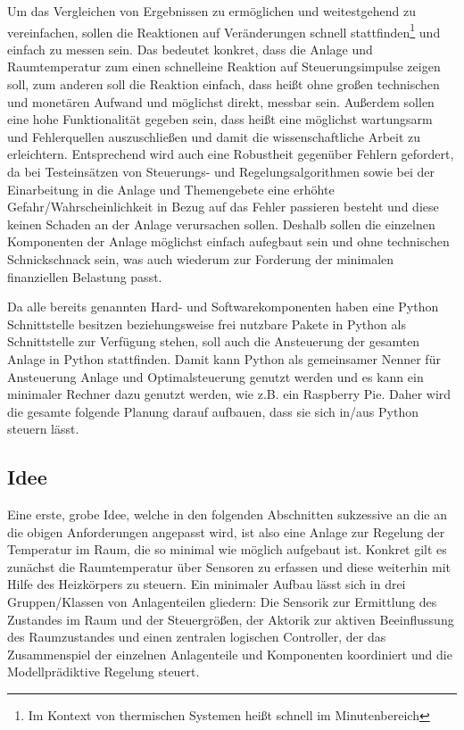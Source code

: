 Um das Vergleichen von Ergebnissen zu ermöglichen und weitestgehend zu vereinfachen, sollen die Reaktionen auf Veränderungen schnell stattfinden\footnote{Im Kontext von thermischen Systemen heißt schnell im Minutenbereich} und einfach zu messen sein. Das bedeutet konkret, dass die Anlage und Raumtemperatur zum einen \Gun schnell\Gob eine Reaktion auf Steuerungsimpulse zeigen soll, zum anderen soll die Reaktion einfach, dass heißt ohne großen technischen und monetären Aufwand und möglichst direkt, messbar sein. 
Außerdem sollen eine hohe Funktionalität gegeben sein, dass heißt eine möglichst wartungsarm und Fehlerquellen auszuschließen und damit die wissenschaftliche Arbeit zu erleichtern. Entsprechend wird auch eine Robustheit gegenüber Fehlern gefordert, da bei Testeinsätzen von Steuerungs- und Regelungsalgorithmen sowie bei der Einarbeitung in die Anlage und Themengebete eine erhöhte Gefahr/Wahrscheinlichkeit in Bezug auf das Fehler passieren besteht und diese keinen Schaden an der Anlage verursachen sollen. Deshalb sollen die einzelnen Komponenten der Anlage möglichst einfach aufegbaut sein und ohne technischen Schnickschnack sein, was auch wiederum zur Forderung der minimalen finanziellen Belastung passt.

Da alle bereits genannten Hard- und Softwarekomponenten haben eine Python Schnittstelle besitzen beziehungsweise frei nutzbare Pakete in Python als Schnittstelle zur Verfügung stehen, soll auch die Ansteuerung der gesamten Anlage in Python stattfinden. Damit kann Python als gemeinsamer Nenner für Ansteuerung Anlage und Optimalsteuerung genutzt werden und es kann ein minimaler Rechner dazu genutzt werden, wie z.B. ein Raspberry Pie. Daher wird die gesamte folgende Planung darauf aufbauen, dass sie sich in/aus Python steuern lässt.


\subsection{Idee}

Eine erste, grobe Idee, welche in den folgenden Abschnitten sukzessive an die an die obigen Anforderungen angepasst wird, ist also eine Anlage zur Regelung der Temperatur im Raum, die so minimal wie möglich aufgebaut ist. Konkret gilt es zunächst die Raumtemperatur über Sensoren zu erfassen und diese weiterhin mit Hilfe des Heizkörpers zu steuern. Ein minimaler Aufbau lässt sich in drei Gruppen/Klassen von Anlagenteilen gliedern: Die Sensorik zur Ermittlung des Zustandes im Raum und der Steuergrößen, der Aktorik zur aktiven Beeinflussung des Raumzustandes und einen zentralen logischen Controller, der das Zusammenspiel der einzelnen Anlagenteile und Komponenten koordiniert und die Modellprädiktive Regelung steuert.

